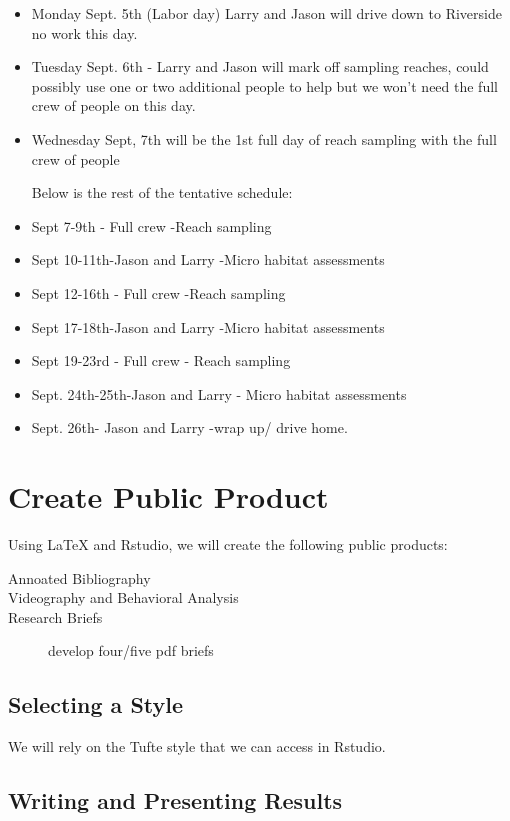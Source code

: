 \documentclass{tufte-handout}\usepackage[]{graphicx}\usepackage[]{color}
\begin{document}
\begin{itemize}
\item Monday Sept. 5th (Labor day) Larry and Jason will drive down to Riverside no work this day.
\item Tuesday Sept. 6th - Larry and Jason will mark off sampling reaches, could possibly use one or two additional people to help but we won't need the full crew of people on this day. 
\item Wednesday Sept, 7th will be the 1st full day of reach sampling with the full crew of people

Below is the rest of the tentative schedule:

\item Sept 7-9th - Full crew -Reach sampling
\item Sept 10-11th-Jason and Larry -Micro habitat assessments
\item Sept 12-16th - Full crew -Reach sampling
\item Sept 17-18th-Jason and Larry -Micro habitat assessments

\item Sept 19-23rd - Full crew - Reach sampling
\item Sept. 24th-25th-Jason and Larry - Micro habitat assessments
\item Sept. 26th- Jason and Larry -wrap up/ drive home.
\end{itemize}

\section{Create Public Product}

Using LaTeX and Rstudio, we will create the following public products: 

\begin{description}
  \item[Annoated Bibliography]
  \item[Videography and Behavioral Analysis]
  \item[Research Briefs] develop four/five pdf briefs
\end{description}

\subsection{Selecting a Style}

We will rely on the Tufte style that we can access in Rstudio. 

\subsection{Writing and Presenting Results}
\end{document}
